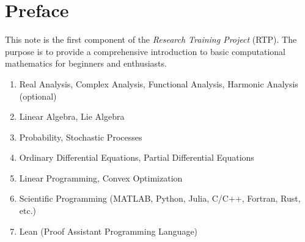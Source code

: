 \chapter*{Preface}

This note is the first component of the \emph{Research Training Project} (RTP).  The purpose is to provide a comprehensive introduction to basic computational mathematics for beginners and enthusiasts. 

\vspace{2cm}


\begin{enumerate}
    \item Real Analysis, Complex Analysis, Functional Analysis, Harmonic Analysis (optional)
    \item Linear Algebra, Lie Algebra 
    \item Probability, Stochastic Processes
    \item Ordinary Differential Equations, Partial Differential Equations 
    \item Linear Programming, Convex Optimization
    \item Scientific Programming (MATLAB, Python, Julia, C/C++, Fortran, Rust, etc.)
    \item Lean (Proof Assistant Programming Language)
\end{enumerate}